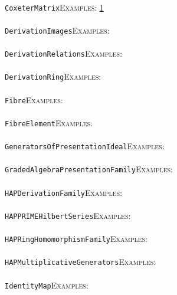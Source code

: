 \documentclass[a4paper,11pt]{report}
\begin{document}
{{ \\
 \texttt{CoxeterMatrix}{\nobreakspace}{\nobreakspace}{\nobreakspace}{\nobreakspace}\textsc{Examples:} \href{../www/SideLinks/About/aboutDavisComplex.html} {1}{\nobreakspace} \\
 \\
 \texttt{DerivationImages}{\nobreakspace}{\nobreakspace}{\nobreakspace}{\nobreakspace}\textsc{Examples:} \\
 \\
 \texttt{DerivationRelations}{\nobreakspace}{\nobreakspace}{\nobreakspace}{\nobreakspace}\textsc{Examples:} \\
 \\
 \texttt{DerivationRing}{\nobreakspace}{\nobreakspace}{\nobreakspace}{\nobreakspace}\textsc{Examples:} \\
 \\
 \texttt{Fibre}{\nobreakspace}{\nobreakspace}{\nobreakspace}{\nobreakspace}\textsc{Examples:} \\
 \\
 \texttt{FibreElement}{\nobreakspace}{\nobreakspace}{\nobreakspace}{\nobreakspace}\textsc{Examples:} \\
 \\
 \texttt{GeneratorsOfPresentationIdeal}{\nobreakspace}{\nobreakspace}{\nobreakspace}{\nobreakspace}\textsc{Examples:} \\
 \\
 \texttt{GradedAlgebraPresentationFamily}{\nobreakspace}{\nobreakspace}{\nobreakspace}{\nobreakspace}\textsc{Examples:} \\
 \\
 \texttt{HAPDerivationFamily}{\nobreakspace}{\nobreakspace}{\nobreakspace}{\nobreakspace}\textsc{Examples:} \\
 \\
 \texttt{HAPPRIME{\textunderscore}HilbertSeries}{\nobreakspace}{\nobreakspace}{\nobreakspace}{\nobreakspace}\textsc{Examples:} \\
 \\
 \texttt{HAPRingHomomorphismFamily}{\nobreakspace}{\nobreakspace}{\nobreakspace}{\nobreakspace}\textsc{Examples:} \\
 \\
 \texttt{HAP{\textunderscore}MultiplicativeGenerators}{\nobreakspace}{\nobreakspace}{\nobreakspace}{\nobreakspace}\textsc{Examples:} \\
 \\
 \texttt{IdentityMap}{\nobreakspace}{\nobreakspace}{\nobreakspace}{\nobreakspace}\textsc{Examples:} \\
}}
\end{document}
